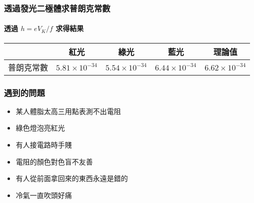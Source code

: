 \documentclass{beamer}
\begin{document}
\begin{frame}
	\frametitle{透過發光二極體求普朗克常數}
	\framesubtitle{透過 $h=eV_K/f$ 求得結果}
	\begin{tabular}{|c|c|c|c|c|}
		\hline
		 & 紅光 & 綠光 & 藍光 & 理論值  \\
		\hline
		普朗克常數 & $5.81 \times 10^{-34}$ & $5.54 \times 10^{-34}$ & $6.44 \times 10^{-34}$ & $6.62 \times 10^{-34}$  \\
		\hline
	\end{tabular}
\end{frame}

\begin{frame}
	\frametitle{遇到的問題}
	\begin{itemize}
		\item 某人體脂太高三用點表測不出電阻
		\item 綠色燈泡亮紅光
		\item 有人接電路時手賤
		\item 電阻的顏色對色盲不友善
		\item 有人從前面拿回來的東西永遠是錯的
		\item 冷氣一直吹頭好痛
	\end{itemize}
\end{frame}
\end{document}
